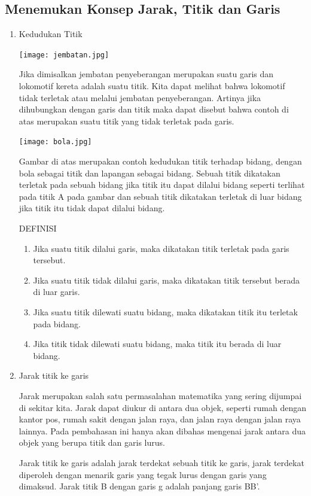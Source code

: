 \documentclass[11pt,fleqn]{book} %
\begin{document}
\subsection{Menemukan Konsep Jarak, Titik dan Garis}
\begin{enumerate}
\item Kedudukan Titik


\texttt{[image: jembatan.jpg]}


Jika dimisalkan jembatan penyeberangan merupakan suatu garis dan lokomotif kereta adalah suatu titik. Kita dapat melihat bahwa lokomotif tidak terletak atau melalui jembatan penyeberangan. Artinya jika dihubungkan dengan garis dan titik maka dapat disebut bahwa contoh di atas merupakan suatu titik yang tidak terletak pada garis.

\texttt{[image: bola.jpg]}

Gambar di atas merupakan contoh kedudukan titik terhadap bidang, dengan bola sebagai titik dan lapangan sebagai bidang. Sebuah titik dikatakan terletak pada sebuah bidang jika titik itu dapat dilalui bidang seperti terlihat pada titik A pada gambar dan sebuah titik dikatakan terletak di luar bidang jika titik itu tidak dapat dilalui bidang.

DEFINISI
\begin{enumerate}
\item Jika suatu titik dilalui garis, maka dikatakan titik terletak pada garis tersebut.
\item Jika suatu titik tidak dilalui garis, maka dikatakan titik tersebut berada di luar garis.
\item Jika suatu titik dilewati suatu bidang, maka dikatakan titik itu terletak pada bidang.
\item Jika titik tidak dilewati suatu bidang, maka titik itu berada di luar bidang.
\end{enumerate}

\item Jarak titik ke garis


Jarak merupakan salah satu permasalahan matematika yang sering dijumpai di sekitar kita. Jarak dapat diukur di antara dua objek, seperti rumah dengan kantor pos, rumah sakit dengan jalan raya, dan jalan raya dengan jalan raya lainnya. Pada pembahasan ini hanya akan dibahas mengenai jarak antara dua objek yang berupa titik dan garis lurus. 

Jarak titik ke garis adalah jarak terdekat sebuah titik ke garis, jarak terdekat diperoleh dengan menarik garis yang tegak lurus dengan garis yang dimaksud. Jarak titik B dengan garis g adalah panjang garis BB'.


\end{enumerate}
\end{document}
